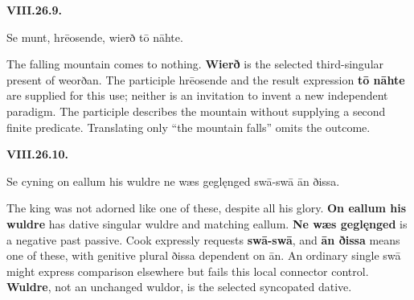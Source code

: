 \par\begin{minipage}{\linewidth}\raggedright
\textbf{VIII.26.9.}

Se munt, hrēosende, wierð tō nāhte.

The falling mountain comes to nothing. \textbf{Wierð} is the selected third-singular present of weorðan. The participle hrēosende and the result expression \textbf{tō nāhte} are supplied for this use; neither is an invitation to invent a new independent paradigm. The participle describes the mountain without supplying a second finite predicate. Translating only “the mountain falls” omits the outcome.

\end{minipage}\par\addvspace{4pt}

\par\begin{minipage}{\linewidth}\raggedright
\textbf{VIII.26.10.}

Se cyning on eallum his wuldre ne wæs geglęnged swā-swā ān ðissa.

The king was not adorned like one of these, despite all his glory. \textbf{On eallum his wuldre} has dative singular wuldre and matching eallum. \textbf{Ne wæs geglęnged} is a negative past passive. Cook expressly requests \textbf{swā-swā}, and \textbf{ān ðissa} means one of these, with genitive plural ðissa dependent on ān. An ordinary single swā might express comparison elsewhere but fails this local connector control. \textbf{Wuldre}, not an unchanged wuldor, is the selected syncopated dative.

\end{minipage}\par\addvspace{4pt}

